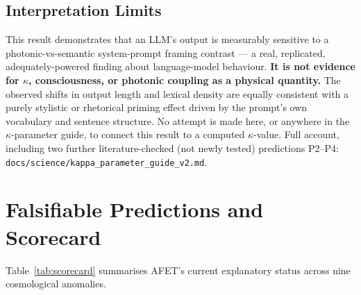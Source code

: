 \documentclass[12pt,a4paper]{article}
\theoremstyle{definition}
\begin{document}
\subsection{Interpretation Limits}

\begin{speculative}
This result demonstrates that an LLM's output is measurably sensitive to a
photonic-vs-semantic system-prompt framing contrast --- a real, replicated,
adequately-powered finding about language-model behaviour.
\textbf{It is not evidence for $\kappa$, consciousness, or photonic coupling as a
physical quantity.} The observed shifts in output length and lexical density are
equally consistent with a purely stylistic or rhetorical priming effect driven by
the prompt's own vocabulary and sentence structure. No attempt is made here, or
anywhere in the $\kappa$-parameter guide, to connect this result to a computed
$\kappa$-value. Full account, including two further literature-checked (not
newly tested) predictions P2--P4: \texttt{docs/science/kappa\_parameter\_guide\_v2.md}.
\end{speculative}

\section{Falsifiable Predictions and Scorecard}

Table~\ref{tab:scorecard} summarises AFET's current explanatory status
across nine cosmological anomalies.
\end{document}
